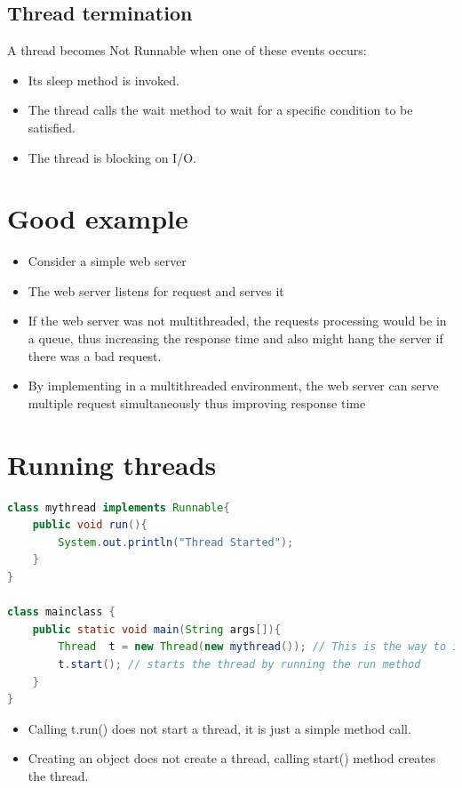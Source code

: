 \documentclass[12pt, a4paper]{book}
\begin{document}
\subsection{Thread termination}
A thread becomes Not Runnable when one of these events occurs:
\begin{itemize}
    \item  Its sleep method is invoked.
    \item  The thread calls the wait method to wait for a specific condition to be satisfied.
    \item  The thread is blocking on I/O.
\end{itemize}
\section{Good example}
\begin{itemize}
    \item Consider a simple web server
    \item    The web server listens for request and serves it
    \item If the web server was not multithreaded, the requests processing would be in a queue, thus increasing the response time and also might hang the server if there was a bad request.
    \item By implementing in a multithreaded environment, the web server can serve multiple request simultaneously thus improving response time
\end{itemize}
\section{Running threads}
\begin{lstlisting}[language=java]
class mythread implements Runnable{
    public void run(){
        System.out.println("Thread Started");
    }
}

class mainclass {
    public static void main(String args[]){
        Thread  t = new Thread(new mythread()); // This is the way to instantiate a 					 thread implementing runnable interface
        t.start(); // starts the thread by running the run method
    }
}
\end{lstlisting}
\begin{itemize}
    \item Calling t.run() does not start a thread, it is just a simple method call.
    \item Creating an object does not create a thread, calling start() method creates the thread.
\end{itemize}
\end{document}
